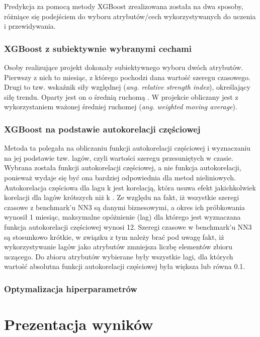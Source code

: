 \documentclass[11pt]{report}
\begin{document}
Predykcja za pomocą metody XGBoost zrealizowana została na dwa sposoby, różniące się podejściem do wyboru atrybutów/cech wykorzystywanych do uczenia i przewidywania.

\subsubsection{XGBoost z subiektywnie wybranymi cechami}
Osoby realizujące projekt dokonały subiektywnego wyboru dwóch atrybutów.
Pierwszy z nich to miesiąc, z którego pochodzi dana wartość szeregu czasowego.
Drugi to tzw. wskaźnik siły względnej (\textit{ang. relative strength index}), określający siłę trendu.
Oparty jest on o średnią ruchomą \cite{noauthor_relative_2018}.
W projekcie obliczany jest z wykorzystaniem ważonej średniej ruchomej (\textit{ang. weighted moving average}).

\subsubsection{XGBoost na podstawie autokorelacji częściowej}
Metoda ta polegała na obliczaniu funkcji autokorelacji częściowej i wyznaczaniu na jej podstawie tzw. lagów, czyli wartości szeregu przesuniętych w czasie.
Wybrana została funkcji autokorelacji częściowej, a nie funkcja autokorelacji, ponieważ wydaje się być ona bardziej odpowiednia dla metod nieliniowych.
Autokorelacja częściowa dla lagu k jest korelacją, która usuwa efekt jakichkolwiek korelacji dla lagów krótszych niż k \cite{cowpertwait_introductory_2009}.
Ze względu na fakt, iż wszystkie szeregi czasowe z benchmark'u NN3 są danymi biznesowymi, a okres ich próbkowania wynosił 1 miesiąc, maksymalne opóżnienie (lag) dla którego jest wyznaczana funkcja autokorelacji częściowej wynosi 12.
Szeregi czasowe w benchmark'u NN3 są stosunkowo krótkie, w związku z tym należy brać pod uwagę fakt, iż wykorzystywanie lagów jako atrybutów zmniejsza liczbę elementów zbioru uczącego.
Do zbioru atrybutów wybierane były wszystkie lagi, dla których wartość absolutna funkcji autokorelacji częściowej była większa lub równa 0.1.

\subsubsection{Optymalizacja hiperparametrów}


\section{Prezentacja wyników}
\end{document}
